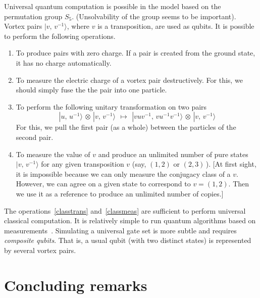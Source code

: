\documentclass[12pt]{article}
\begin{document}
Universal quantum computation is possible in the model based on the
permutation group $S_5$. (Unsolvability of the group seems to be important).
Vortex pairs $|v,\,v^{-1}\rangle$, where $v$ is a transposition, are
used as qubits. It is possible to perform the following operations.
\begin{enumerate}
\item 
  To produce pairs with zero charge. If a pair is created from the ground
  state, it has no charge automatically.
\item 
  To measure the electric charge of a vortex pair destructively. For this, we
  should simply fuse the the pair into one particle.
\item \label{classtrans}
  To perform the following unitary transformation on two pairs
\begin{equation}
  |u,\,u^{-1}\rangle\, \otimes\, |v,\,v^{-1}\rangle\,\ \mapsto\,\ 
  |vuv^{-1},\,vu^{-1}v^{-1}\rangle\, \otimes\, |v,\,v^{-1}\rangle
\end{equation}
  For this, we pull the first pair (as a whole) between the particles of the
  second pair.
\item \label{classmeas}
  To measure the value of $v$ and produce an unlimited number of pure states
  $|v,\,v^{-1}\rangle$ for any given transposition $v$ (say, $(1,2)$ or
  $(2,3)\,$). [At first sight, it is impossible because we can only measure
  the conjugacy class of a $v$. However, we can agree on a given state to
  correspond to $v=(1,2)$. Then we use it as a reference to produce an
  unlimited number of copies.]
\end{enumerate}

The operations~\ref{classtrans} and~\ref{classmeas} are sufficient to perform
universal classical computation. It is relatively simple to run quantum
algorithms based on measurements~\cite{Kit3}. Simulating a universal gate set
is more subtle and requires \emph{composite qubits}. That is, a usual qubit
(with two distinct states) is represented by several vortex pairs.


\section*{Concluding remarks}
\end{document}
